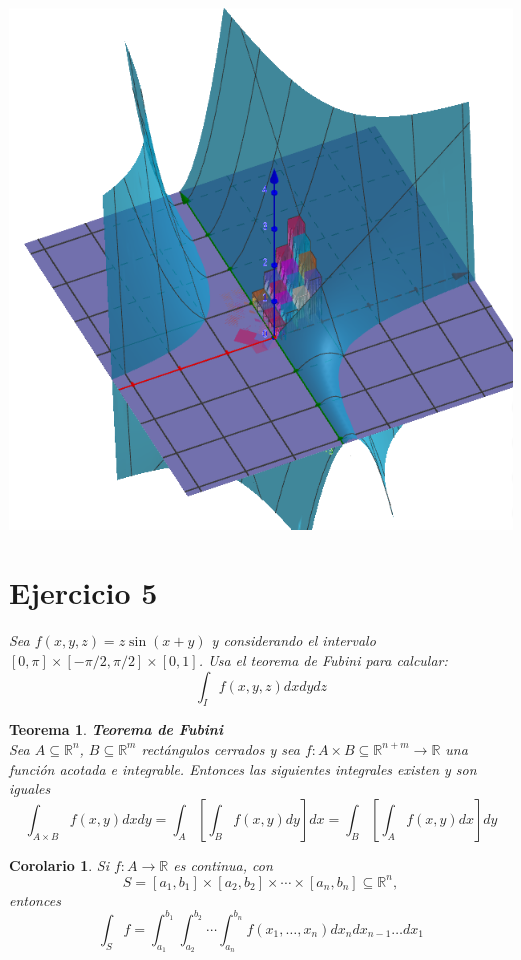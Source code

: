 \documentclass[a4paper,12pt]{article}
\newtheorem{teoremas}{Teorema}[subsection]
\newtheorem{Corolario}{Corolario}[subsection]
\begin{document}
\begin{center}
    \includegraphics[scale=0.5]{graph.png}
\end{center}
\newpage
\section{Ejercicio 5}
\textit{Sea $f(x,y,z) = z \sin(x+y)$ y considerando el intervalo $[0,\pi]\times[-\pi/2,\pi/2]\times[0,1]$. Usa el teorema
de Fubini para calcular:}
\[\int_{I} f(x,y,z) dxdydz\]


\begin{teoremas} {\textbf{Teorema de Fubini}}\\
    Sea $A\subseteq \mathbb{R}^n$, $B\subseteq \mathbb{R}^m$ rectángulos cerrados y sea $f : A\times B\subseteq \mathbb{R}^{n+m} \rightarrow \mathbb{R}$
    una función acotada e integrable. Entonces las siguientes integrales existen y son iguales
    \[\int_{A\times B} f(x,y)dxdy = \int_{A}\left[ \int_{B} f(x,y)dy\right]dx = \int_{B}\left[ \int_{A} f(x,y)dx\right]dy\]

\end{teoremas}


\begin{Corolario}
    Si $f : A \rightarrow \mathbb{R}$ es continua, con
    \[S = [a_1,b_1] \times [a_2,b_2] \times \cdots \times [a_n,b_n]   \subseteq \mathbb{R}^n,\]
    entonces
    \[\int_{S} f = \int_{a_1}^{b_1} \int_{a_2}^{b_2} \cdots \int_{a_n}^{b_n} f(x_1,\ldots,x_n) dx_{n}dx_{n-1}\ldots dx_1\]
\end{Corolario}
\end{document}
